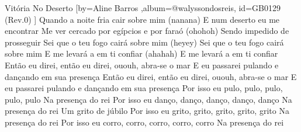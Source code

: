 \beginsong
{Vitória No Deserto %
}[by={Aline Barros %
},album={@walyssondosreis},
id={GB0129 %
(Rev.0) %
}]
\beginverse*
Quando a noite fria cair sobre mim (nanana)
E num deserto eu me encontrar
Me ver cercado por egípcios e por faraó (ohohoh)
Sendo impedido de prosseguir
\endverse
\beginverse*
Sei que o teu fogo cairá sobre mim (heyey)
Sei que o teu fogo cairá sobre mim
E me levará a em ti confiar (ahahah)
E me levará a em ti confiar
\endverse
\beginchorus
Então eu direi, então eu direi, ououh, abra-se o mar
E eu passarei pulando e dançando em sua presença
Então eu direi, então eu direi, ououh, abra-se o mar
E eu passarei pulando e dançando em sua presença
\endchorus
\beginverse*
Por isso eu pulo, pulo, pulo, pulo, pulo
Na presença do rei
Por isso eu danço, danço, danço, danço, danço
Na presença do rei
Um grito de júbilo
Por isso eu grito, grito, grito, grito, grito
Na presença do rei
Por isso eu corro, corro, corro, corro, corro
Na presença do rei
\endverse

